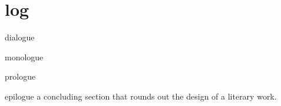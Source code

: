 \chapter{log}

\begin{word}{dialogue}
\end{word}

\begin{word}{monologue}
\end{word}

\begin{word}{prologue}
\end{word}

\begin{word}{epilogue}
    a concluding section that rounds out the design of a literary work.
\end{word}